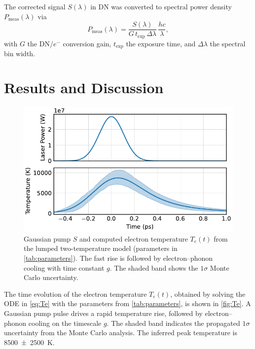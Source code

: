 \documentclass[
	parskip=half,
	a4paper,
]{scrarticle}
\begin{document}
The corrected signal \(S(\lambda)\) in DN was converted to spectral power density \(P_{\text{meas}}(\lambda)\) via
\begin{equation}
  P_{\text{meas}}(\lambda)
  = \frac{S(\lambda)}{G\,t_{\text{exp}}\,\Delta\lambda}\,\frac{hc}{\lambda},
\end{equation}
with \(G\) the DN/\(e^-\) conversion gain, \(t_{\text{exp}}\) the exposure time, and \(\Delta\lambda\) the spectral bin width.  


\section{Results and Discussion}
\begin{figure}
    \centering
    \includegraphics{../analysis/figures/model te.pdf}
    \caption{Gaussian pump \(S\) and computed electron temperature \(T_e(t)\) from the lumped two-temperature model (parameters in \autoref{tab:parameters}). The fast rise is followed by electron–phonon cooling with time constant \(g\). The shaded band shows the \(1\sigma\) Monte Carlo uncertainty.}
    \label{fig:Te}
\end{figure}
The time evolution of the electron temperature \(T_e(t)\), obtained by solving the ODE in \autoref{eq:Te} with the parameters from \autoref{tab:parameters}, is shown in \autoref{fig:Te}. A Gaussian pump pulse drives a rapid temperature rise, followed by electron–phonon cooling on the timescale \(g\). The shaded band indicates the propagated $1\sigma$ uncertainty from the Monte Carlo analysis. The inferred peak temperature is \SI{8500(2500)}{\kelvin}.
\end{document}
